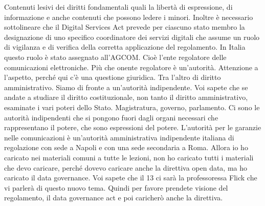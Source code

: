 Contenuti lesivi dei diritti fondamentali quali la libertà di espressione, di informazione e anche contenuti che possono ledere i minori.
Inoltre è necessario sottolineare che il Digital Services Act prevede per ciascuno stato membro la designazione di uno specifico coordinatore dei servizi digitali che assume un ruolo di vigilanza e di verifica della corretta applicazione del regolamento. In Italia questo ruolo è stato assegnato all'AGCOM.
Cioè l'ente regolatore delle comunicazioni elettroniche.
Più che onente regolatore è un'autorità.
Attenzione a l'aspetto, perché qui c'è una questione giuridica.
Tra l'altro di diritto amministrativo.
Siamo di fronte a un'autorità indipendente.
Voi sapete che se andate a studiare il diritto costituzionale, non tanto il diritto amministrativo, esaminate i vari poteri dello Stato.
Magistratura, governo, parlamento.
Ci sono le autorità indipendenti che si pongono fuori dagli organi necessari che rappresentano il potere, che sono espressioni del potere.
L'autorità per le garanzie nelle comunicazioni è un'autorità amministrativa indipendente italiana di regolazione con sede a Napoli e con una sede secondaria a Roma.
Allora io ho caricato nei materiali comuni a tutte le lezioni, non ho caricato tutti i materiali che devo caricare, perché dovevo caricare anche la direttiva open data, ma ho caricato il data governance.
Voi sapete che il 13 ci sarà la professoressa Flick che vi parlerà di questo nuovo tema.
Quindi per favore prendete visione del regolamento, il data governance act e poi caricherò anche la direttiva.
